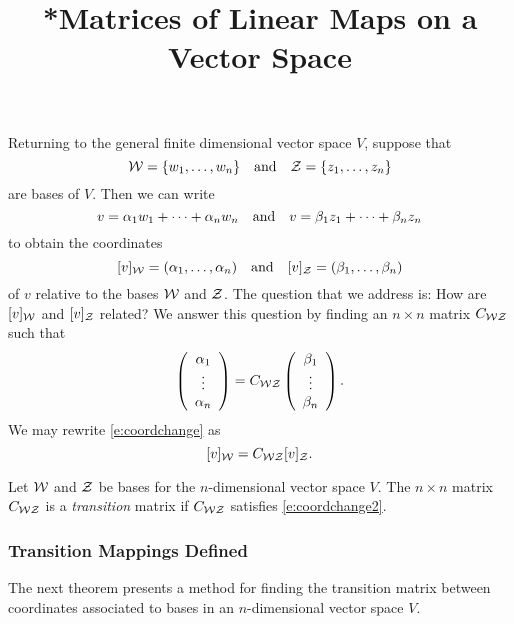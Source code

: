 \documentclass{ximera}
\title{*Matrices of Linear Maps on a Vector Space}
\begin{document}
\begin{abstract}
\end{abstract}
\maketitle

  \label{MALT}
  


Returning to the general finite dimensional vector space $V$, suppose that
\[
{\cal W} = \{w_1,\ldots,w_n\} \quad\mbox{and}\quad {\cal Z} = \{z_1,\ldots,z_n\}
\]
are bases of $V$.  Then we can write
\[
v = \alpha_1 w_1 + \cdots + \alpha_n w_n \quad\mbox{and}\quad
v = \beta_1 z_1 + \cdots + \beta_n z_n
\]
to obtain the coordinates
\begin{equation}  \label{e:vincoords}
[v]_{\cal W} = (\alpha_1,\ldots,\alpha_n) \quad\mbox{and}\quad
[v]_{\cal Z} = (\beta_1,\ldots,\beta_n)
\end{equation}
of $v$ relative to the bases ${\cal W}$ and ${\cal Z}$.  The question that
we address is: How are $[v]_{\cal W}$ and $[v]_{\cal Z}$ related?  We answer
this question by finding an $n\times n$ matrix $C_{{\cal W}{\cal Z}}$ such that
\begin{equation} \label{e:coordchange}
\left(\begin{array}{c} \alpha_1 \\ \vdots \\ \alpha_{n}\end{array}\right) = C_{{\cal W}{\cal Z}} \left(\begin{array}{c} \beta_1 \\ \vdots \\ \beta_{n}\end{array}\right).
\end{equation}
We may rewrite \eqref{e:coordchange} as
\begin{equation}  \label{e:coordchange2}
[v]_{\cal W} = C_{{\cal W}{\cal Z}}[v]_{\cal Z}.
\end{equation}

\begin{definition}
Let ${\cal W}$ and ${\cal Z}$ be bases for the $n$-dimensional
vector space $V$.  The $n\times n$ matrix $C_{{\cal W}{\cal Z}}$
is a {\em transition\/} matrix if $C_{{\cal W}{\cal Z}}$ satisfies
\eqref{e:coordchange2}.
\end{definition}  


\subsubsection*{Transition Mappings Defined}

The next theorem presents a method for finding the transition matrix
between coordinates associated to bases in an $n$-dimensional vector
space $V$.
\end{document}
